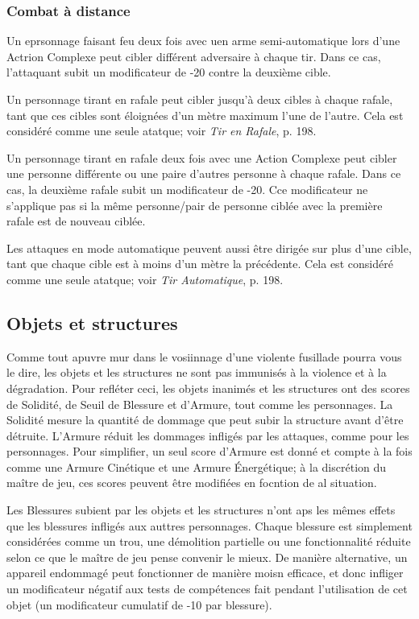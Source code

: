\subsubsection{Combat à distance} 

Un eprsonnage faisant feu deux fois avec uen arme semi-automatique lors d'une Actrion Complexe peut cibler différent adversaire à chaque tir. Dans ce cas, l'attaquant subit un modificateur de -20 contre la deuxième cible. 

Un personnage tirant en rafale peut cibler jusqu'à deux cibles à chaque rafale, tant que ces cibles sont éloignées d'un mètre maximum l'une de l'autre. Cela est considéré comme une seule atatque; voir \emph{Tir en Rafale}, p. 198. 

Un personnage tirant en rafale deux fois avec une Action Complexe peut cibler une personne différente ou une paire d'autres personne à chaque rafale. Dans ce cas, la deuxième rafale subit un modificateur de -20. Cce modificateur ne s'applique pas si la même personne/pair de personne ciblée avec la première rafale est de nouveau ciblée. 

Les attaques en mode automatique peuvent aussi être dirigée sur plus d'une cible, tant que chaque cible est à moins d'un mètre la précédente. Cela est considéré comme une seule atatque; voir \emph{Tir Automatique}, p. 198. 



\subsection{Objets et structures} \label{sec:objects-structures} 

Comme tout apuvre mur dans le vosiinnage d'une violente fusillade pourra vous le dire, les objets et les structures ne sont pas immunisés à la violence et à la dégradation. Pour refléter ceci, les objets inanimés et les structures ont des scores de Solidité, de Seuil de Blessure et d'Armure, tout comme les personnages. La Solidité mesure la quantité de dommage que peut subir la structure avant d'être détruite. L'Armure réduit les dommages infligés par les attaques, comme pour les personnages. Pour simplifier, un seul score d'Armure est donné et compte à la fois comme une Armure Cinétique et une Armure Énergétique; à la discrétion du maître de jeu, ces scores peuvent être modifiées en focntion de al situation. 

Les Blessures subient par les objets et les structures n'ont aps les mêmes effets que les blessures infligés aux auttres personnages. Chaque blessure est simplement considérées comme un trou, une démolition partielle ou une fonctionnalité réduite selon ce que le maître de jeu pense convenir le mieux. De manière alternative, un appareil endommagé peut fonctionner de manière moisn efficace, et donc infliger un modificateur négatif aux tests de compétences fait pendant l'utilisation de cet objet (un modificateur cumulatif de -10 par blessure). 

